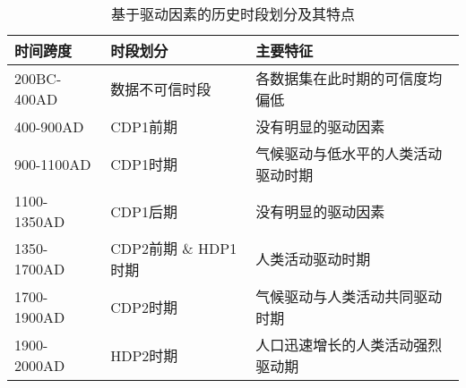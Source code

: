 \begin{table}[htbp]
    \centering
    \caption{基于驱动因素的历史时段划分及其特点}
      \begin{tabularx}{\textwidth}{LLp{0.5\textwidth}}
      \toprule
      时间跨度  & 时段划分  & 主要特征 \\
      \midrule
      200BC-400AD & 数据不可信时段 & 各数据集在此时期的可信度均偏低 \\
      400-900AD & CDP1前期 & 没有明显的驱动因素 \\
      900-1100AD & CDP1时期 & 气候驱动与低水平的人类活动驱动时期 \\
      1100-1350AD & CDP1后期 & 没有明显的驱动因素 \\
      1350-1700AD & CDP2前期 \& HDP1时期 & 人类活动驱动时期 \\
      1700-1900AD & CDP2时期 & 气候驱动与人类活动共同驱动时期 \\
      1900-2000AD & HDP2时期 & 人口迅速增长的人类活动强烈驱动期 \\
      \bottomrule
      \end{tabularx}%
    \label{tab:ch3:periods_division}%
\end{table}%
